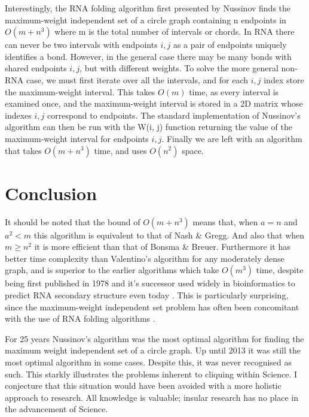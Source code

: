 \documentclass[12pt, a4paper]{article}
\begin{document}
Interestingly, the RNA folding algorithm first presented by Nussinov finds the maximum-weight independent set of a circle graph containing n endpoints in $O(m + n^3)$ where m is the total number of intervals or chords. In RNA there can never be two intervals with endpoints $i, j$ as a pair of endpoints uniquely identifies a bond. However, in the general case there may be many bonds with shared endpoints $i, j$, but with different weights. To solve the more general non-RNA case, we must first iterate over all the intervals, and for each $i, j$ index store the maximum-weight interval. This takes $O(m)$ time, as every interval is examined once, and the maximum-weight interval is stored in a 2D matrix whose indexes $i, j$ correspond to endpoints. The standard implementation of Nussinov’s algorithm can then be run with the W(i, j) function returning the value of the maximum-weight interval for endpoints $i, j$. Finally we are left with an algorithm that takes $O(m + n^3)$ time, and uses $O(n^2)$ space.


\section*{Conclusion}
It should be noted that the bound of $O(m + n^3)$ means that, when $a = n$ and $a^2 < m$ this algorithm is equivalent to that of Nash \& Gregg. And also that when $m \geq n^2$ it is more efficient than that of Bonsma \& Breuer. Furthermore it has better time complexity than Valentino's algorithm for any moderately dense graph, and is superior to the earlier algorithms which take $O(m^3)$ time, despite being first published in 1978 and it’s successor used widely in bioinformatics to predict RNA secondary structure even today \cite{lorenz2011viennarna}. This is particularly surprising, since the maximum-weight independent set problem has often been concomitant with the use of RNA folding algorithms \cite{sperschneider2008knotseeker, bon2011tt2ne}.

For 25 years Nussinov's algorithm was the most optimal algorithm for finding the maximum weight independent set of a circle graph. Up until 2013 it was still the most optimal algorithm in some cases. Despite this, it was never recognised as such. This starkly illustrates the problems inherent to cliquing within Science. I conjecture that this situation would have been avoided with a more holistic approach to research. All knowledge is valuable; insular research has no place in the advancement of Science.




\end{document}
